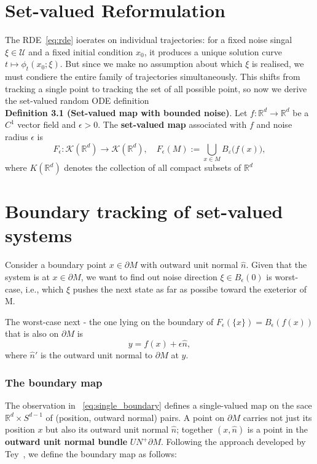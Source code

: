 \documentclass[11pt]{article}
\begin{document}
\section{Set-valued Reformulation}
The RDE~\eqref{eq:rde} ioerates on individual trajectories: for a fixed noise singal $\xi \in \mathcal{U} $ and a fixed initial condition $x_0$, it produces a unique solution curve \(t \mapsto \phi_t(x_0;\xi)\). But since we make no assumption about which $\xi$ is realised, we must condiere the entire family of trajectories simultaneously. This shifts from tracking a single point to tracking the set of all possible point, so now we derive the set-valued random ODE definition\\
\textbf{Definition 3.1 (Set-valued map with bounded noise)}. Let $f: \mathbb{R}^d \to \mathbb{R}^d$ be a $C^1$ vector field and $\epsilon > 0$. The \textbf{set-valued map} associated with $f$ and noise radius $\epsilon$ is
\[
    F_\epsilon: \mathcal{K}(\mathbb{R}^d) \to \mathcal{K}(\mathbb{R}^d), \quad F_\epsilon(M) := \bigcup_{x \in M} B_\varepsilon\!\bigl(f(x)\bigr), \tag{4}
\]
where $K(\mathbb{R}^d)$ denotes the collection of all compact subsets of $\mathbb{R}^d$
\section{Boundary tracking of set-valued systems}
Consider a boundary point $x \in \partial M$ with outward unit normal \(\hat{n}\). Given that the system is at $x \in \partial M$, we want to find out noise direction $\xi \in B_\epsilon(0)$ is worst-case, i.e., which $\xi$ pushes the next state as far as possibe toward the exeterior of M. 

The worst-case next - the one lying on the boundary of $F_{\epsilon}(\{x\}) = B_\epsilon(f(x))$ that is also on $\partial M$ is
\[
    y = f(x) + \epsilon\hat{n}, \tag{5}\label{eq:single_boundary}
\]
where $\hat{n}'$ is the outward unit normal to $\partial M$ at $y$. 

\subsubsection{The boundary map}
The observation in ~\eqref{eq:single_boundary} defines a single-valued map on the sace $\mathbb{R}^d \times S^{d-1}$ of (position, outward normal) pairs. A point on $\partial M$ carries not just its position $x$ but also its outward unit normal $\hat{n}$; together $(x,\hat{n})$ is a point in the \textbf{outward unit normal bundle} $UN^{+}\partial M$. Following the approach developed by Tey~\cite{tey2023}, we define the boundary map as follows:
\end{document}
